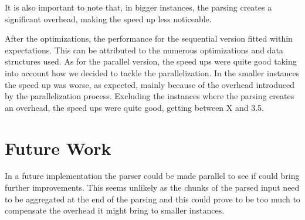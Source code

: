\documentclass[a4paper]{article}
\begin{document}
It is also important to note that, in bigger instances, the parsing creates a
significant overhead, making the speed up less noticeable.

After the optimizations, the performance for the sequential version fitted
within expectations. This can be attributed to the numerous optimizations and
data structures used.  As for the parallel version, the speed ups were quite good
taking into account how we decided to tackle the parallelization. In the smaller
instances the speed up was worse, as expected, mainly because of the overhead
introduced by the parallelization process. Excluding the instances where the
parsing creates an overhead, the speed ups were quite good, getting between X
and 3.5.

\section{Future Work}
In a future implementation the parser could be made parallel to see if could
bring further improvements. This seems unlikely as the chunks of the parsed
input need to be aggregated at the end of the parsing and this could prove to be
too much to compensate the overhead it might bring to smaller instances.


\end{document}
